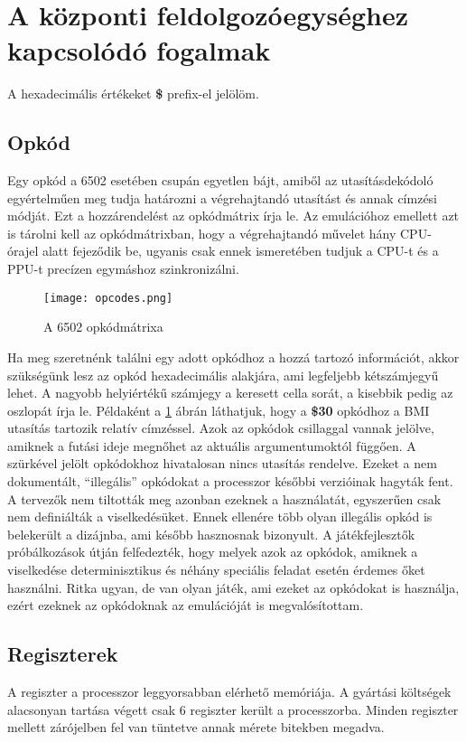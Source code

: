 \section{A központi feldolgozóegységhez kapcsolódó fogalmak}

\begin{note}
	A hexadecimális értékeket \textbf{\$} prefix-el jelölöm.
\end{note}

\subsection{Opkód} 
Egy opkód a 6502 esetében csupán egyetlen bájt, amiből az utasításdekódoló egyértelműen meg tudja határozni a végrehajtandó utasítást és annak címzési módját.
Ezt a hozzárendelést az opkódmátrix írja le. Az emulációhoz emellett azt is tárolni kell az opkódmátrixban, hogy a végrehajtandó művelet hány CPU-órajel alatt fejeződik be, ugyanis csak ennek ismeretében tudjuk a CPU-t és a PPU-t precízen egymáshoz szinkronizálni.

\begin{figure}[H]
	\centering
	\texttt{[image: opcodes.png]}
	\caption{A 6502 opkódmátrixa}
	\label{fig:opcodes}
\end{figure}

Ha meg szeretnénk találni egy adott opkódhoz a hozzá tartozó információt, akkor szükségünk lesz az opkód hexadecimális alakjára, ami legfeljebb kétszámjegyű lehet. A nagyobb helyiértékű számjegy a keresett cella sorát, a kisebbik pedig az oszlopát írja le. Példaként a \ref{fig:opcodes} ábrán láthatjuk, hogy a \textbf{\$30} opkódhoz a BMI utasítás tartozik relatív címzéssel.
Azok az opkódok csillaggal vannak jelölve, amiknek a futási ideje megnőhet az aktuális argumentumoktól függően.
A szürkével jelölt opkódokhoz hivatalosan nincs utasítás rendelve. 
Ezeket a nem dokumentált, ``illegális'' opkódokat a processzor későbbi 
verzióinak hagyták fent. A tervezők nem tiltották meg azonban ezeknek a használatát, 
egyszerűen csak nem definiálták a viselkedésüket. Ennek ellenére több olyan illegális opkód is belekerült a dizájnba, ami később hasznosnak bizonyult. A játékfejlesztők próbálkozások útján
felfedezték, hogy melyek azok az opkódok, amiknek a viselkedése determinisztikus és néhány speciális feladat esetén érdemes őket használni.
Ritka ugyan, de van olyan játék, ami ezeket az opkódokat is használja, ezért ezeknek az opkódoknak az emulációját is megvalósítottam.

\subsection{Regiszterek}
A regiszter a processzor leggyorsabban elérhető memóriája.
A gyártási költségek alacsonyan tartása végett csak 6 regiszter került a processzorba.
Minden regiszter mellett zárójelben fel van tüntetve annak mérete bitekben megadva.

